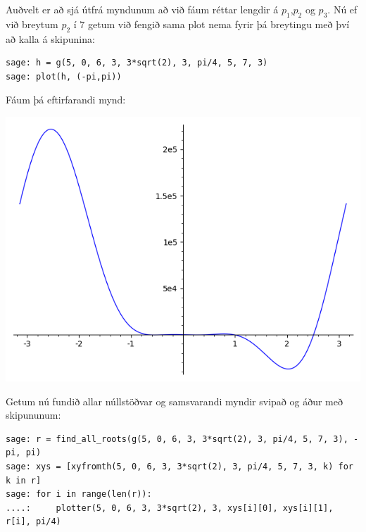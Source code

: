 \documentclass{article}
\begin{document}
\vspace*{0.5cm}

Auðvelt er að sjá útfrá myndunum að við fáum réttar lengdir á $p_1$,$p_2$ og $p_3$. Nú ef við breytum $p_2$ í $7$ getum við fengið sama plot nema fyrir þá breytingu með því að kalla á skipunina: \\

\begin{verbatim}
sage: h = g(5, 0, 6, 3, 3*sqrt(2), 3, pi/4, 5, 7, 3)
sage: plot(h, (-pi,pi))
\end{verbatim}

\vspace*{0.5cm}

Fáum þá eftirfarandi mynd: \\

\begin{center}
\includegraphics[scale=0.75]{lidur5aplot}
\end{center}

\vspace*{0.5cm}

Getum nú fundið allar núllstöðvar og samsvarandi myndir svipað og áður með skipununum: \\

\begin{footnotesize}
\begin{verbatim}
sage: r = find_all_roots(g(5, 0, 6, 3, 3*sqrt(2), 3, pi/4, 5, 7, 3), -pi, pi)
sage: xys = [xyfromth(5, 0, 6, 3, 3*sqrt(2), 3, pi/4, 5, 7, 3, k) for k in r]
sage: for i in range(len(r)):
....:     plotter(5, 0, 6, 3, 3*sqrt(2), 3, xys[i][0], xys[i][1], r[i], pi/4)
\end{verbatim}
\end{footnotesize}
\end{document}
